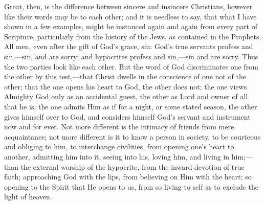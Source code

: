 Great, then, is the difference between sincere and insincere
Christians, however like their words may be to each other; and it is
needless to say, that what I have shown in a few examples, might be
instanced again and again from every part of Scripture, particularly
from the history of the Jews, as contained in the Prophets. All men,
even after the gift of God's grace, sin: God's true servants profess
and sin,—sin, and are sorry; and hypocrites profess and sin,—sin
and are sorry. Thus the two parties look like each other. But the word
of God discriminates one from the other by this test,—that Christ
dwells in the conscience of one not of the other; that the one opens
his heart to God, the other does not; the one views Almighty God only
as an accidental guest, the other as Lord and owner of all that he is;
the one admits Him as if for a night, or some stated season, the other
gives himself over to God, and considers himself God's servant and
instrument now and for ever. Not more different is the intimacy of
friends from mere acquaintance; not more different is it to know a
person in society, to be courteous and obliging to him, to interchange
civilities, from opening one's heart to another, admitting him into
it, seeing into his, loving him, and living in him;—than the
external worship of the hypocrite, from the inward devotion of true
faith; approaching God with the lips, from believing on Him with the
heart; so opening to the Spirit that He opens to us, from so living to
self as to exclude the light of heaven.

